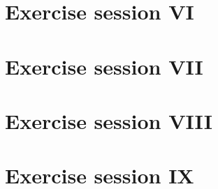 \documentclass[12pt, a4paper]{report}
\begin{document}
    \chapter{Exercise session VI}
    
    
    
    

    \chapter{Exercise session VII}
    
    

    \chapter{Exercise session VIII}
    
    
    
    

    \chapter{Exercise session IX}
    
    
    
\end{document}
